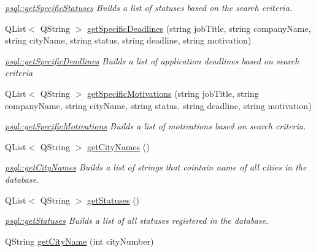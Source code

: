 \begin{DoxyCompactItemize}
\begin{DoxyCompactList}\small\item\em \mbox{\hyperlink{classpsql_aa04154eae71d7cdfd0fb8ab67ac032e7}{psql\+::get\+Specific\+Statuses}} Builds a list of statuses based on the search criteria. \end{DoxyCompactList}\item 
Q\+List$<$ Q\+String $>$ \mbox{\hyperlink{classpsql_a415ebb495b96ac805880401555f72825}{get\+Specific\+Deadlines}} (string job\+Title, string company\+Name, string city\+Name, string status, string deadline, string motivation)
\begin{DoxyCompactList}\small\item\em \mbox{\hyperlink{classpsql_a415ebb495b96ac805880401555f72825}{psql\+::get\+Specific\+Deadlines}} Builds a list of application deadlines based on search criteria \end{DoxyCompactList}\item 
Q\+List$<$ Q\+String $>$ \mbox{\hyperlink{classpsql_a7c86e4ba33784dece1bf897537087a68}{get\+Specific\+Motivations}} (string job\+Title, string company\+Name, string city\+Name, string status, string deadline, string motivation)
\begin{DoxyCompactList}\small\item\em \mbox{\hyperlink{classpsql_a7c86e4ba33784dece1bf897537087a68}{psql\+::get\+Specific\+Motivations}} Builds a list of motivations based on search criteria. \end{DoxyCompactList}\item 
Q\+List$<$ Q\+String $>$ \mbox{\hyperlink{classpsql_a42ee0cf90055ba6a7a6f564cf04d8bb8}{get\+City\+Names}} ()
\begin{DoxyCompactList}\small\item\em \mbox{\hyperlink{classpsql_a42ee0cf90055ba6a7a6f564cf04d8bb8}{psql\+::get\+City\+Names}} Builds a list of strings that cointain name of all cities in the database. \end{DoxyCompactList}\item 
Q\+List$<$ Q\+String $>$ \mbox{\hyperlink{classpsql_a14854d28aabc7e658aea87a7b8b52e5c}{get\+Statuses}} ()
\begin{DoxyCompactList}\small\item\em \mbox{\hyperlink{classpsql_a14854d28aabc7e658aea87a7b8b52e5c}{psql\+::get\+Statuses}} Builds a list of all statuses registered in the database. \end{DoxyCompactList}\item 
Q\+String \mbox{\hyperlink{classpsql_a7acc18034ef60c8a1e69b0e1a15d8ab2}{get\+City\+Name}} (int city\+Number)

\end{DoxyCompactItemize}
